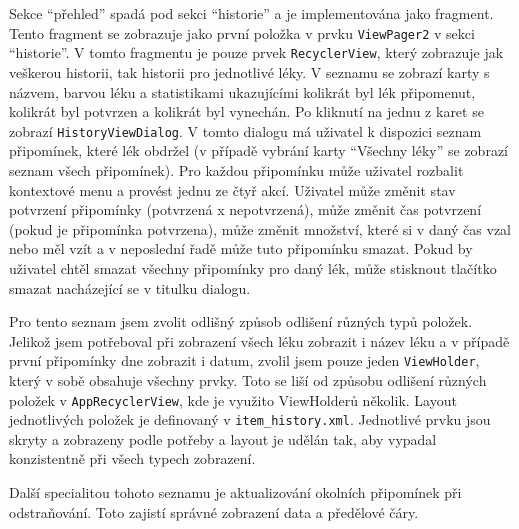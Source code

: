 \documentclass[../TakeYourPill.tex]{subfiles}
\begin{document}
Sekce \enquote{přehled} spadá pod sekci \enquote{historie} a je implementována jako fragment. Tento fragment se zobrazuje jako první položka v prvku \texttt{ViewPager2} v sekci \enquote{historie}. V tomto fragmentu je pouze prvek \texttt{RecyclerView}, který zobrazuje jak veškerou historii, tak historii pro jednotlivé léky. V seznamu se zobrazí karty s názvem, barvou léku a statistikami ukazujícími kolikrát byl lék připomenut, kolikrát byl potvrzen a kolikrát byl vynechán. Po kliknutí na jednu z karet se zobrazí \texttt{HistoryViewDialog}\label{sec:historydialog}. V tomto dialogu má uživatel k dispozici seznam připomínek, které lék obdržel (v případě vybrání karty \enquote{Všechny léky} se zobrazí seznam všech připomínek). Pro každou připomínku může uživatel rozbalit kontextové menu a provést jednu ze čtyř akcí. Uživatel může změnit stav potvrzení připomínky (potvrzená x nepotvrzená), může změnit čas potvrzení (pokud je připomínka potvrzena), může změnit množství, které si v daný čas vzal nebo měl vzít a v neposlední řadě může tuto připomínku smazat. Pokud by uživatel chtěl smazat všechny připomínky pro daný lék, může stisknout tlačítko smazat nacházející se v titulku dialogu.

Pro tento seznam jsem zvolit odlišný způsob odlišení různých typů položek. Jelikož jsem potřeboval při zobrazení všech léku zobrazit i název léku a v případě první připomínky dne zobrazit i datum, zvolil jsem pouze jeden \texttt{ViewHolder}, který v sobě obsahuje všechny prvky. Toto se liší od způsobu odlišení různých položek v \texttt{AppRecyclerView}, kde je využito ViewHolderů několik. Layout jednotlivých položek je definovaný v \texttt{item\_history.xml}. Jednotlivé prvku jsou skryty a zobrazeny podle potřeby a layout je udělán tak, aby vypadal konzistentně při všech typech zobrazení.

Další specialitou tohoto seznamu je aktualizování okolních připomínek při odstraňování. Toto zajistí správné zobrazení data a předělové čáry.
\end{document}
